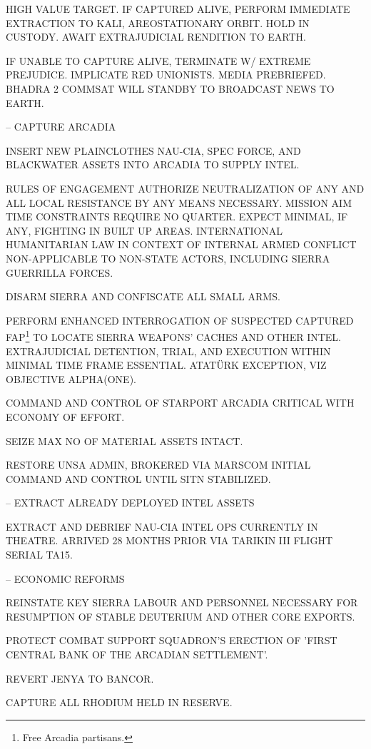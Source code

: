     \startitemize[n]
    \item HIGH VALUE TARGET. IF CAPTURED ALIVE, PERFORM IMMEDIATE EXTRACTION TO KALI, AREOSTATIONARY ORBIT. HOLD IN CUSTODY. AWAIT EXTRAJUDICIAL RENDITION TO EARTH.
    \item IF UNABLE TO CAPTURE ALIVE, TERMINATE W/ EXTREME PREJUDICE. IMPLICATE RED UNIONISTS. MEDIA PREBRIEFED. BHADRA 2 COMMSAT WILL STANDBY TO BROADCAST NEWS TO EARTH.
    \stopitemize

\item {} -- CAPTURE ARCADIA
    \startitemize[n]
    \item INSERT NEW PLAINCLOTHES NAU-CIA, SPEC FORCE, AND BLACKWATER ASSETS INTO ARCADIA TO SUPPLY INTEL.
    \item RULES OF ENGAGEMENT AUTHORIZE NEUTRALIZATION OF ANY AND ALL LOCAL RESISTANCE BY ANY MEANS NECESSARY. MISSION AIM TIME CONSTRAINTS REQUIRE NO QUARTER. EXPECT MINIMAL, IF ANY, FIGHTING IN BUILT UP AREAS. INTERNATIONAL HUMANITARIAN LAW IN CONTEXT OF INTERNAL ARMED CONFLICT NON-APPLICABLE TO NON-STATE ACTORS, INCLUDING SIERRA GUERRILLA FORCES.
    \item DISARM SIERRA AND CONFISCATE ALL SMALL ARMS.
    \item PERFORM ENHANCED INTERROGATION OF SUSPECTED CAPTURED FAP\footnote{Free Arcadia partisans.} TO LOCATE SIERRA WEAPONS' CACHES AND OTHER INTEL. EXTRAJUDICIAL DETENTION, TRIAL, AND EXECUTION WITHIN MINIMAL TIME FRAME ESSENTIAL. ATATÜRK EXCEPTION, VIZ OBJECTIVE ALPHA(ONE).
    \item COMMAND AND CONTROL OF STARPORT ARCADIA CRITICAL WITH ECONOMY OF EFFORT.
    \item SEIZE MAX NO OF MATERIAL ASSETS INTACT.
    \item RESTORE UNSA ADMIN, BROKERED VIA MARSCOM INITIAL COMMAND AND CONTROL UNTIL SITN STABILIZED.
    \stopitemize

\item {} -- EXTRACT ALREADY DEPLOYED INTEL ASSETS
    \startitemize[n]
    \item EXTRACT AND DEBRIEF NAU-CIA INTEL OPS CURRENTLY IN THEATRE. ARRIVED 28 MONTHS PRIOR VIA TARIKIN III FLIGHT SERIAL TA15.
    \stopitemize

\item {} -- ECONOMIC REFORMS
    \startitemize[n]
    \item REINSTATE KEY SIERRA LABOUR AND PERSONNEL NECESSARY FOR RESUMPTION OF STABLE DEUTERIUM AND OTHER CORE EXPORTS.
    \item PROTECT COMBAT SUPPORT SQUADRON'S ERECTION OF 'FIRST CENTRAL BANK OF THE ARCADIAN SETTLEMENT'.
    \item REVERT JENYA TO BANCOR.
    \item CAPTURE ALL RHODIUM HELD IN RESERVE.
    \stopitemize

